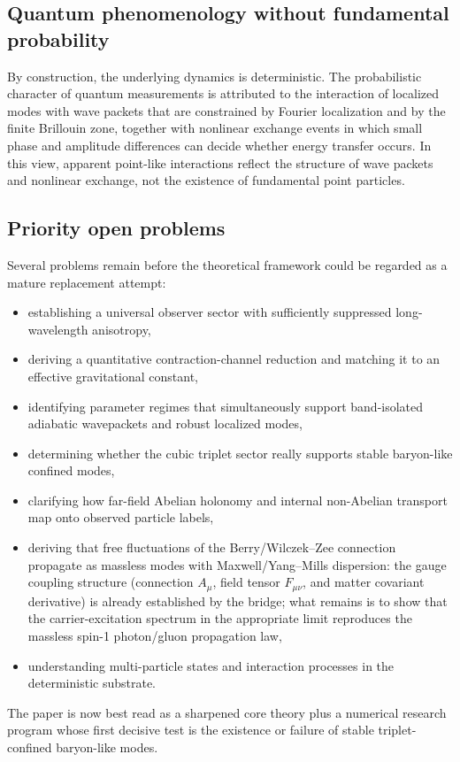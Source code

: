 \subsection{Quantum phenomenology without fundamental probability}

By construction, the underlying dynamics is deterministic.
The probabilistic character of quantum measurements is attributed to the interaction of localized modes with wave packets
that are constrained by Fourier localization and by the finite Brillouin zone, together with nonlinear exchange events
in which small phase and amplitude differences can decide whether energy transfer occurs.
In this view, apparent point-like interactions reflect the structure of wave packets and nonlinear exchange,
not the existence of fundamental point particles.

\subsection{Priority open problems}

Several problems remain before the theoretical framework could be regarded as a mature replacement attempt:
\begin{itemize}
\item establishing a universal observer sector with sufficiently suppressed long-wavelength anisotropy,
\item deriving a quantitative contraction-channel reduction and matching it to an effective gravitational constant,
\item identifying parameter regimes that simultaneously support band-isolated adiabatic wavepackets
and robust localized modes,
\item determining whether the cubic triplet sector really supports stable baryon-like confined modes,
\item clarifying how far-field Abelian holonomy and internal non-Abelian transport map onto observed particle labels,
\item deriving that free fluctuations of the Berry/Wilczek--Zee connection propagate as massless modes with Maxwell/Yang--Mills dispersion: the gauge coupling structure (connection $A_\mu$, field tensor $F_{\mu\nu}$, and matter covariant derivative) is already established by the bridge; what remains is to show that the carrier-excitation spectrum in the appropriate limit reproduces the massless spin-1 photon/gluon propagation law,
\item understanding multi-particle states and interaction processes in the deterministic substrate.
\end{itemize}
The paper is now best read as a sharpened core theory plus a numerical research program whose first decisive test is the
existence or failure of stable triplet-confined baryon-like modes.
